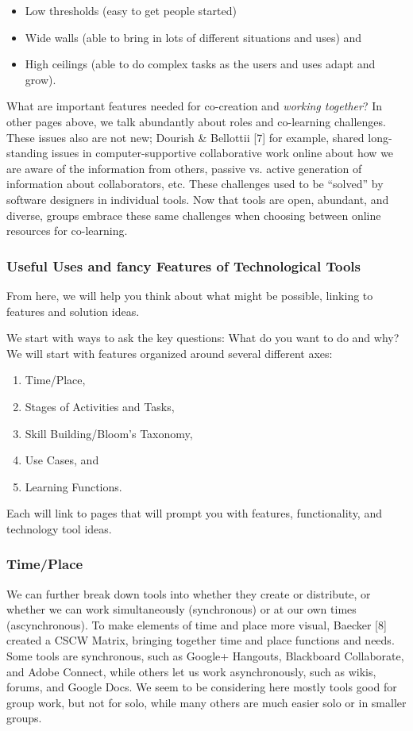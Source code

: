 \begin{itemize}[noitemsep]
\item
  Low thresholds (easy to get people started)
\item
  Wide walls (able to bring in lots of different situations and uses)
  and
\item
  High ceilings (able to do complex tasks as the users and uses adapt
  and grow).
\end{itemize}
What are important features needed for co-creation and \emph{working
together}? In other pages above, we talk abundantly about roles and
co-learning challenges. These issues also are not new; Dourish \&
Bellottii {[}7{]} for example, shared long-standing issues in
computer-supportive collaborative work online about how we are aware of
the information from others, passive vs. active generation of
information about collaborators, etc. These challenges used to be
``solved'' by software designers in individual tools. Now that tools are
open, abundant, and diverse, groups embrace these same challenges when
choosing between online resources for co-learning.

\subsubsection{Useful Uses and fancy Features of Technological Tools}

From here, we will help you think about what might be possible, linking
to features and solution ideas.

We start with ways to ask the key questions: What do you want to do and
why? We will start with features organized around several different
axes:

\begin{enumerate}
\item Time/Place,
\item Stages of Activities and Tasks,
\item Skill Building/Bloom's Taxonomy,
\item Use Cases, and
\item Learning Functions.
\end{enumerate}
Each will link to pages that will prompt you with features,
functionality, and technology tool ideas.

\subsubsection{Time/Place}

We can further break down tools into whether they create or distribute,
or whether we can work simultaneously (synchronous) or at our own times
(ascynchronous). To make elements of time and place more visual, Baecker
{[}8{]} created a CSCW Matrix, bringing together time and place
functions and needs.  Some tools are synchronous, such as Google+ Hangouts, Blackboard
Collaborate, and Adobe Connect, while others let us work asynchronously,
such as wikis, forums, and Google Docs. We seem to be considering here
mostly tools good for group work, but not for solo, while many others
are much easier solo or in smaller groups.

